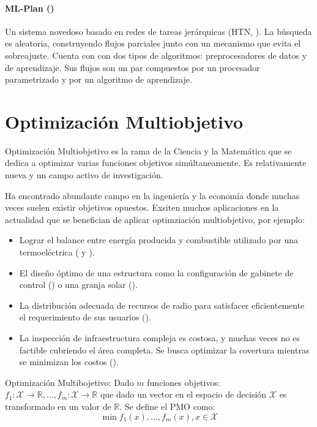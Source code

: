  \paragraph{ML-Plan (\cite{mohr2018ml})} Un sistema novedoso basado en redes de tareas jer\'arquicas (HTN, \cite{erol1994umcp}). La b\'usqueda es aleatoria, construyendo flujos parciales junto con un mecanismo que evita el sobreajuste. Cuenta con con dos tipos de algoritmos:  preprocesadores de datos y de aprendizaje. Sus flujos son un par compuestos por un procesador parametrizado y por un algoritmo de aprendizaje.
    


\section{Optimizaci\'on Multiobjetivo}\label{proposal:moo}
Optimizaci\'on Multiobjetivo es la rama de la Ciencia y la Matem\'atica que se dedica a optimizar varias funciones objetivos sim\'ultaneamente. Es relativamente nueva y un campo activo de investigaci\'on.

Ha encontrado abundante campo en la ingenier\'ia y la econom\'ia donde muchas veces suelen existir objetivos opuestos. Exsiten muchos aplicaciones en la actualidad que se benefician de aplicar optimziaci\'on multiobjetivo, por ejemplo:
\begin{itemize}
    \item Lograr el balance entre energ\'ia producida y combustible utilizado por una termoel\'ectrica (\cite{shirazi2012thermal} y \cite{shirazi2014thermal}).
    \item El dise\~no \'optimo de una estructura como la configuraci\'on de gabinete de control (\cite{pllana2019customizing}) o una granja solar (\cite{ganesan2013hypervolume}).
    \item La distribuci\'on adecuada de recursos de radio para satisfacer eficientemente el requerimiento de sus usuarios (\cite{bjornson2013optimal}).
    \item La inspecci\'on de infraestructura compleja es costosa, y muchas veces no es factible cubriendo el \'area completa. Se busca optimizar la covertura mientras se minimizan los costos (\cite{ellefsen2017multiobjective}).
\end{itemize}

\begin{definition}{Optimizaci\'on Multibojetivo:}
    \label{background:def:moo}
     Dado $m$ funciones objetivos: $f_1: \mathcal{X} \rightarrow \mathbb{R}, ..., f_m: \mathcal{X} \rightarrow \mathbb{R}$ que dado un vector en el espacio de decisi\'on $\mathcal{X}$ es transformado en un valor de $\mathbb{R}$. Se define el PMO como:
    \begin{equation*}
        \min f_1(x), ..., f_m(x), x \in \mathcal{X}
    \end{equation*}
\end{definition}


